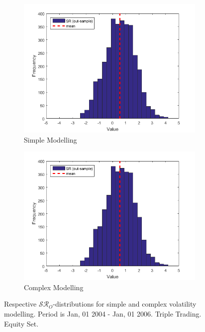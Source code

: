 \documentclass[11pt,a4,twosided,singlespacing,titlepagenumber=on]{scrreprt}
\numberwithin{equation}{chapter} %
\theoremstyle{remark}
\begin{document}
\begin{figure}[H]
    \centering
    \begin{subfigure}[t]{0.49\textwidth}
        \centering
        \includegraphics[width=1\textwidth]{res/params/5114_5845/sr}
        \caption{Simple Modelling}
    \end{subfigure}
    \begin{subfigure}[t]{0.49\textwidth}
        \centering
        \includegraphics[width=1\textwidth]{res/params/5114_5845/sr}
        \caption{Complex Modelling}
    \end{subfigure}
    \caption[]{Respective $\mathcal{SR}_O$-distributions for simple and complex volatility modelling. Period is Jan, 01 2004 - Jan, 01 2006. Triple Trading. Equity Set.}
    \label{fig:sharpe_ratio_comparison}
\end{figure}
\end{document}
